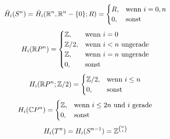 \documentclass{cheat-sheet}
\newcommand{\RH}{\tilde{H}} %
\begin{document}
\begin{bsp}
  \[
    \RH_i(S^n) = \RH_i(\R^n, \R^n - \{0\}; R) = \begin{cases}
      R, & \text{wenn $i=0,n$} \\
      0, & \text{sonst}
    \end{cases}
  \]
  \[
    H_i(\mathbb{R} P^n) = \begin{cases}
      \mathbb{Z}, & \text{wenn $i=0$} \\
      \mathbb{Z}/2, & \text{wenn $i < n$ ungerade} \\
      \mathbb{Z}, & \text{wenn $i=n$ ungerade} \\
      0, & \text{sonst}
    \end{cases}
  \]
  \[
    H_i(\mathbb{R} P^n; \mathbb{Z}/2) = \begin{cases}
      \mathbb{Z}/2, & \text{wenn $i \leq n$} \\
      0, & \text{sonst}
    \end{cases}
  \]
  \[
    H_i(\mathbb{C} P^n) = \begin{cases}
      \mathbb{Z}, & \text{wenn $i \leq 2n$ und $i$ gerade} \\
      0, & \text{sonst}
    \end{cases}
  \]
  \[
    H_i(T^n) = H_i(S^{n-1}) = \mathbb{Z}^{n \choose i}
  \]
\end{bsp}
\end{document}
